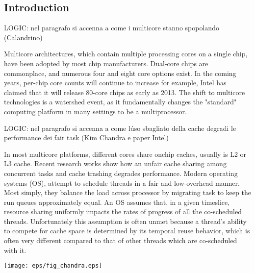 \documentclass[a4paper,10pt]{article}
\begin{document}
\vspace{4ex}	%
\begin{multicols}{2}

\section{Introduction}

LOGIC: nel paragrafo si accenna a come i multicore stanno spopolando (Calandrino)

Multicore architectures, which contain multiple processing cores on a single chip, have been adopted by most chip manufacturers.
Dual-core chips are commonplace, and numerous four and eight core options exist. In the coming years, per-chip core counts will continue to
increase for example, Intel has claimed that it will release 80-core chips as early as 2013. The shift to multicore technologies is a 
watershed event, as it fundamentally changes the "standard" computing platform in many settings to be a multiprocessor. 

LOGIC: nel paragrafo si accenna a come l\'uso sbagliato della cache degradi le performance dei fair task (Kim Chandra e paper Intel)

In most multicore platforms, different cores share onchip caches, usually is L2 or L3 cache. Recent research works show how an unfair cache sharing 
among concurrent tasks and cache trashing degrades performance. Modern operating systems (OS), attempt to schedule threads in a 
fair and low-overhead manner.
Most simply, they balance the load across processor by migrating task to keep the run queues approximately equal. An OS assumes that, 
in a given timeslice, resource sharing uniformly impacts the rates of progress of all the co-scheduled threads. 
Unfortunately this assumption is often unmet because a thread's ability to compete for cache space is determined by its temporal reuse behavior,
which is often very different compared to that of other threads which are co-scheduled with it. 

\begin{center}
	\texttt{[image: eps/fig\_chandra.eps]}
	\label{fig:chandra}
\end{center}


\end{multicols}
\end{document}
